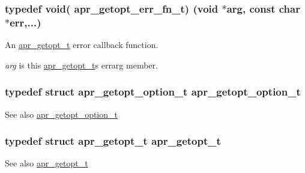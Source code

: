 \subsubsection[{\texorpdfstring{apr\+\_\+getopt\+\_\+err\+\_\+fn\+\_\+t}{apr_getopt_err_fn_t}}]{\setlength{\rightskip}{0pt plus 5cm}typedef {\bf void}( apr\+\_\+getopt\+\_\+err\+\_\+fn\+\_\+t) ({\bf void} $\ast${\bf arg}, const char $\ast${\bf err},...)}\hypertarget{group__apr__getopt_ga67c949e3d93e50e12347acd92a3bbe18}{}\label{group__apr__getopt_ga67c949e3d93e50e12347acd92a3bbe18}
An {\ttfamily \hyperlink{structapr__getopt__t}{apr\+\_\+getopt\+\_\+t}} error callback function.

{\itshape arg} is this {\ttfamily \hyperlink{structapr__getopt__t}{apr\+\_\+getopt\+\_\+t}\textquotesingle{}s} {\ttfamily errarg} member. 
\subsubsection[{\texorpdfstring{apr\+\_\+getopt\+\_\+option\+\_\+t}{apr_getopt_option_t}}]{\setlength{\rightskip}{0pt plus 5cm}typedef struct {\bf apr\+\_\+getopt\+\_\+option\+\_\+t} {\bf apr\+\_\+getopt\+\_\+option\+\_\+t}}\hypertarget{group__apr__getopt_ga114d2af52f3573eaeee2ffa73b2c4ff5}{}\label{group__apr__getopt_ga114d2af52f3573eaeee2ffa73b2c4ff5}
\begin{DoxySeeAlso}{See also}
\hyperlink{structapr__getopt__option__t}{apr\+\_\+getopt\+\_\+option\+\_\+t} 
\end{DoxySeeAlso}
\subsubsection[{\texorpdfstring{apr\+\_\+getopt\+\_\+t}{apr_getopt_t}}]{\setlength{\rightskip}{0pt plus 5cm}typedef struct {\bf apr\+\_\+getopt\+\_\+t} {\bf apr\+\_\+getopt\+\_\+t}}\hypertarget{group__apr__getopt_gaed49565eab64803e93f76d0c40d6873d}{}\label{group__apr__getopt_gaed49565eab64803e93f76d0c40d6873d}
\begin{DoxySeeAlso}{See also}
\hyperlink{structapr__getopt__t}{apr\+\_\+getopt\+\_\+t} 
\end{DoxySeeAlso}


